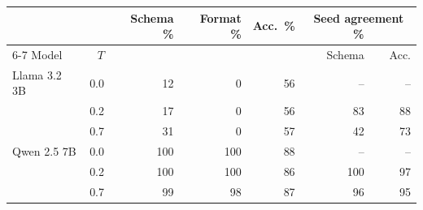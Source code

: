\begin{tabular}{lrrrrrr}
\toprule
 & & Schema \% & Format \% & Acc.\ \% & \multicolumn{2}{c}{Seed agreement \%} \\
\cmidrule(lr){6-7}
Model & $T$ & & & & Schema & Acc. \\
\midrule
Llama 3.2 3B & 0.0 & 12 & 0 & 56 & -- & -- \\
 & 0.2 & 17 & 0 & 56 & 83 & 88 \\
 & 0.7 & 31 & 0 & 57 & 42 & 73 \\
Qwen 2.5 7B & 0.0 & 100 & 100 & 88 & -- & -- \\
 & 0.2 & 100 & 100 & 86 & 100 & 97 \\
 & 0.7 & 99 & 98 & 87 & 96 & 95 \\
\bottomrule
\end{tabular}
